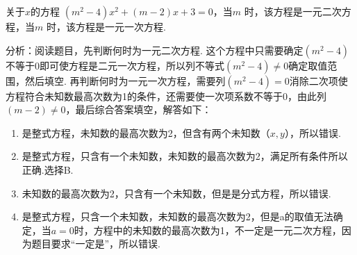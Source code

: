 \documentclass[lang=cn, 10pt, titlestyle=hang, oneside]{elegantbook}
\begin{document}
\begin{example}
关于$x$的方程 $(m^2 - 4)x^2 + (m - 2)x + 3 = 0$，当$m$ \underline{\hspace{3.5em}} 时，该方程是一元二次方程，当$m$ \underline{\hspace{3.5em}} 时，该方程是一元一次方程.
\end{example}
\par
\begin{solution}
    分析：阅读题目，先判断何时为一元二次方程. 这个方程中只需要确定$(m^2 - 4)$不等于0即可使方程是二元一次方程，所以列不等式$(m^2 - 4)\ne0$确定取值范围，然后填空. 再判断何时为一元一次方程，需要列$(m^2 - 4)=0$消除二次项使方程符合未知数最高次数为1的条件，还需要使一次项系数不等于0，由此列$(m-2)\ne 0$，最后综合答案填空，解答如下：
    \begin{enumerate}[label=\Alph*.]
        \item 是整式方程，未知数的最高次数为2，但含有两个未知数（\(x,y\)），所以错误.
        \item 是整式方程，只含有一个未知数，未知数的最高次数为2，满足所有条件所以正确.选择B.
        \item 未知数的最高次数为2，只含有一个未知数，但是是分式方程，所以错误.
        \item 是整式方程，只含一个未知数，未知数的最高次数为2，但是a的取值无法确定，当\(a=0\)时，方程中的未知数的最高次数为1，不一定是一元二次方程，因为题目要求“一定是”，所以错误.
    \end{enumerate}
\end{solution}
\end{document}

